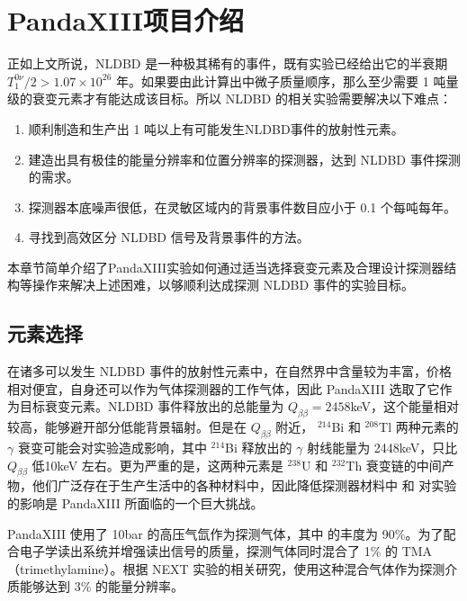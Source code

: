 \chapter{PandaXIII项目介绍}
\label{chapter:intro}

正如上文所说，NLDBD 是一种极其稀有的事件，既有实验已经给出它的半衰期 $T^{0\nu}_1/2>1.07\times10^{26}$ 年。如果要由此计算出中微子质量顺序，那么至少需要 1 吨量级的衰变元素才有能达成该目标。所以 NLDBD 的相关实验需要解决以下难点：

\vspace{0.4cm}
\begin{enumerate}
    \item 顺利制造和生产出 1 吨以上有可能发生NLDBD事件的放射性元素。
    \item 建造出具有极佳的能量分辨率和位置分辨率的探测器，达到 NLDBD 事件探测的需求。
    \item 探测器本底噪声很低，在灵敏区域内的背景事件数目应小于 0.1 个每吨每年。
    \item 寻找到高效区分 NLDBD 信号及背景事件的方法。
\end{enumerate}
\vspace{0.4cm}

本章节简单介绍了PandaXIII实验如何通过适当选择衰变元素及合理设计探测器结构等操作来解决上述困难，以够顺利达成探测 NLDBD 事件的实验目标。

\section{元素选择}

在诸多可以发生 NLDBD 事件的放射性元素中，\xeots 在自然界中含量较为丰富，价格相对便宜，自身还可以作为气体探测器的工作气体，因此 PandaXIII 选取了它作为目标衰变元素。\xeots NLDBD 事件释放出的总能量为 $Q_{\beta\beta}=2458$keV，这个能量相对较高，能够避开部分低能背景辐射。但是在 $Q_{\beta\beta}$ 附近， $^{214}$Bi 和 $^{208}$Tl 两种元素的 $\gamma$ 衰变可能会对实验造成影响，其中 $^{214}$Bi 释放出的 $\gamma$ 射线能量为 2448keV，只比 $Q_{\beta\beta}$ 低10keV 左右。更为严重的是，这两种元素是 $^{238}$U 和 $^{232}$Th 衰变链的中间产物，他们广泛存在于生产生活中的各种材料中，因此降低探测器材料中 \utte 和 \thttt 对实验的影响是 PandaXIII 所面临的一个巨大挑战。

PandaXIII 使用了 10bar 的高压气氙作为探测气体，其中 \xeots 的丰度为 90\%。为了配合电子学读出系统并增强读出信号的质量，探测气体同时混合了 1\% 的 TMA（trimethylamine）。根据 NEXT 实验的相关研究，使用这种混合气体作为探测介质能够达到 3\% 的能量分辨率\supercite{azevedoh2015accurate}。

